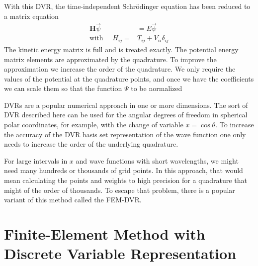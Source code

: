 \documentclass[aps,amssymb,superscriptaddress,floatfix]{revtex4}
\begin{document}
With this DVR,  the time-independent Schr\"odinger equation has been reduced to a matrix equation 
\begin{equation}
\begin{split}
\mathbf{H} \vec{\psi} &= E \vec{\psi} \\
\textrm{with }\quad H_{ij} =& T_{ij} + V_{ii} \delta_{ij}
\end{split}
\end{equation}
The kinetic energy matrix is full and is treated exactly.  The potential energy matrix elements are approximated by the quadrature.  To improve the approximation we increase the order of the quadrature.  We only require the values of the potential at the quadrature points, and once we have the coefficients we can scale them so that the function $\Psi$ to be normalized

DVRs are a popular numerical approach in one or more dimensions.  The sort of DVR described here can be used for the angular degrees of freedom in spherical polar coordinates, for example, with the change of variable $x=\cos \theta$.  To increase the accuracy of the DVR basis set representation of the wave function one only needs to increase the order of the underlying quadrature.

For large intervals in $x$ and wave functions with short wavelengths,  we might need many hundreds or thousands of grid points.   In this approach, that  would mean calculating the points and weights to high precision for a quadrature that might of the order of thousands.  To escape that problem, there is a popular variant of this method called the FEM-DVR.

\section{Finite-Element Method with Discrete Variable Representation}
\end{document}
